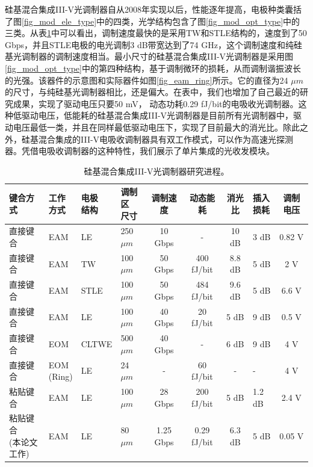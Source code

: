 硅基混合集成III-V光调制器自从2008年实现以后，性能逐年提高，电极种类囊括了图\ref{fig_mod_ele_type}中的四类，光学结构包含了图\ref{fig_mod_opt_type}中的三类。从表\ref{sil_IIIV_mod}中可以看出，调制速度最快的是采用TW和STLE结构的，速度到了50 Gbps，并且STLE电极的电光调制3 dB带宽达到了74 GHz\cite{tang2012over}，这个调制速度和纯硅基光调制器的调制速度相当。最小尺寸的硅基混合集成III-V光调制器是采用图\ref{fig_mod_opt_type}中的第四种结构，基于调制微环的损耗，从而调制谐振波长的光强。该器件的示意图和实际器件如图\ref{fig_eam_ring}所示\cite{Srinivasan2012micro}。它的直径为24 $\mu m$的尺寸，与纯硅基光调制器相比，还是偏大。在表中，我们也增加了自己最近的研究成果，实现了驱动电压只要50 mV， 动态功耗0.29 fJ/bit的电吸收光调制器。这种低驱动电压，低能耗的硅基混合集成III-V光调制器是目前所有光调制器中，驱动电压最低一类，并且在同样最低驱动电压下，实现了目前最大的消光比。除此之外，硅基混合集成的III-V电吸收调制器具有双工作模式，可以作为高速光探测器。凭借电吸收调制器的这种特性，我们展示了单片集成的光收发模块\cite{chen2016wavelength}。
{
	\begin{table}[htb]
		\caption{硅基混合集成III-V光调制器研究进程。}
		\label{sil_IIIV_mod}
		\centering
		\begin{tabular}[t]{p{2cm}p{1cm}p{1cm}p{1.2cm}cccp{1cm}c}
			\hline
			键合方式  & \tabincell{c}{工作 \\ 方式} &\tabincell{c}{电极 \\ 结构}  & \tabincell{c}{调制区 \\ 尺寸} & 调制速度 & 动态能耗 & 消光比 & \tabincell{c}{插入 \\ 损耗} & 调制电压\\
			\hline
			直接键合\cite{kuo2008high} & EAM & LE & 250 $\mu m$ & 10 Gbps & - & 10 dB & 3 dB & 0.82 V\\
			直接键合\cite{tang201150} & EAM & TW & 100 $\mu m$ & 50 Gbps & 400 fJ/bit & 8.8 dB & 5 dB & 2 V\\
			直接键合\cite{tang2012over} & EAM & STLE & 100 $\mu m$ & 50 Gbps & 484 fJ/bit & 9.6 dB & 5 dB & 6.6 V\\
			直接键合\cite{tang2012energy} & EAM & LE & 100 $\mu m$ & 40 Gbps & 20 fJ/bit & 5 dB & 9 dB & 0.5 V\\
			直接键合\cite{chen2011forty} & EOM & CLTWE & 500 $\mu m$ & 40 Gbps & - & 6 dB & 9 dB & 4 V\\
			直接键合\cite{Srinivasan2012micro} & \tabincell{c}{EOM\\(Ring)} & LE & 24 $\mu m$ & - & 60 fJ/bit & - & - & 4 V\\
			粘贴键合\cite{fu20155} & EAM & LE  & 100 $\mu m$ & 28 Gbps & 200 fJ/bit & 5 dB & 1.2 dB & 2.4 V\\
			\tabincell{c}{粘贴键合 \\ (本论文工作)} & EAM & LE  & 80 $\mu m$ & 1.25 Gbps & 0.29 fJ/bit & 6.3 dB & 5 dB & 0.05 V\\
			\hline
		\end{tabular}
	\end{table}
}

